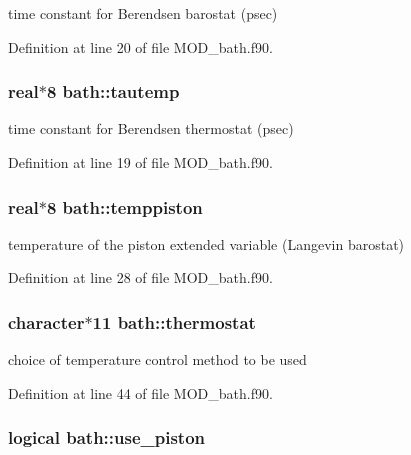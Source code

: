 time constant for Berendsen barostat (psec) 



Definition at line 20 of file M\-O\-D\-\_\-bath.\-f90.

\hypertarget{classbath_a2c37bd76a8c3687874959925eb5b73ef}{
\subsubsection[{tautemp}]{\setlength{\rightskip}{0pt plus 5cm}real$\ast$8 bath\-::tautemp}}\label{classbath_a2c37bd76a8c3687874959925eb5b73ef}


time constant for Berendsen thermostat (psec) 



Definition at line 19 of file M\-O\-D\-\_\-bath.\-f90.

\hypertarget{classbath_a354d5cdd8a7c243a018af69e9532456d}{
\subsubsection[{temppiston}]{\setlength{\rightskip}{0pt plus 5cm}real$\ast$8 bath\-::temppiston}}\label{classbath_a354d5cdd8a7c243a018af69e9532456d}


temperature of the piston extended variable (Langevin barostat) 



Definition at line 28 of file M\-O\-D\-\_\-bath.\-f90.

\hypertarget{classbath_aa9a2b3b2f92760da86d3c52fb3d9a3d6}{
\subsubsection[{thermostat}]{\setlength{\rightskip}{0pt plus 5cm}character$\ast$11 bath\-::thermostat}}\label{classbath_aa9a2b3b2f92760da86d3c52fb3d9a3d6}


choice of temperature control method to be used 



Definition at line 44 of file M\-O\-D\-\_\-bath.\-f90.

\hypertarget{classbath_a587fc21d72bea065a8b3bdd07d016bed}{
\subsubsection[{use\-\_\-piston}]{\setlength{\rightskip}{0pt plus 5cm}logical bath\-::use\-\_\-piston}}\label{classbath_a587fc21d72bea065a8b3bdd07d016bed}


